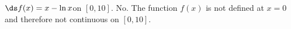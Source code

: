 {$\ds f(x) = x-\ln x$\quad  on \quad $[0,10]$.
}
{No.  The function $f(x)$ is not defined at $x=0$ and therefore not continuous on $[0,10]$.
}
